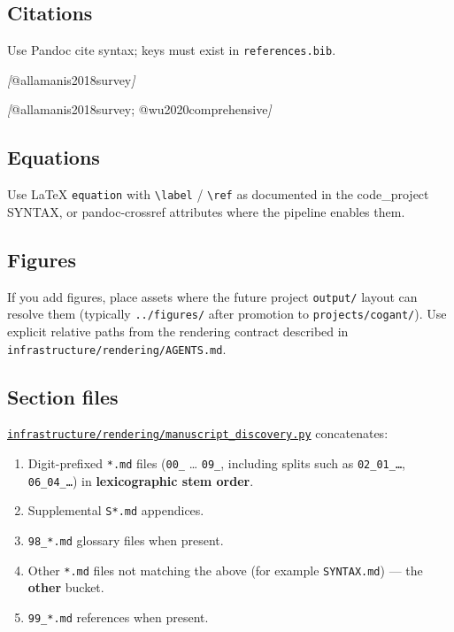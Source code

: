 \documentclass[
]{article}
\newenvironment{Shaded}{}{}
\newcommand{\CommentTok}[1]{\textcolor[rgb]{0.38,0.63,0.69}{\textit{#1}}}
\newcommand{\OtherTok}[1]{\textcolor[rgb]{0.00,0.44,0.13}{#1}}
\providecommand{\tightlist}{%
  \setlength{\itemsep}{0pt}\setlength{\parskip}{0pt}}
\begin{document}
\subsection{Citations}\label{citations}

Use Pandoc cite syntax; keys must exist in \texttt{references.bib}.

\begin{Shaded}
\begin{Highlighting}[]
\CommentTok{[}\OtherTok{@allamanis2018survey}\CommentTok{]}

\CommentTok{[}\OtherTok{@allamanis2018survey; @wu2020comprehensive}\CommentTok{]}
\end{Highlighting}
\end{Shaded}

\subsection{Equations}\label{equations}

Use LaTeX \texttt{equation} with \texttt{\textbackslash{}label} /
\texttt{\textbackslash{}ref} as documented in the code\_project SYNTAX,
or pandoc-crossref attributes where the pipeline enables them.

\subsection{Figures}\label{figures}

If you add figures, place assets where the future project
\texttt{output/} layout can resolve them (typically \texttt{../figures/}
after promotion to \texttt{projects/cogant/}). Use explicit relative
paths from the rendering contract described in
\texttt{infrastructure/rendering/AGENTS.md}.

\subsection{Section files}\label{section-files}

\href{../../../infrastructure/rendering/manuscript_discovery.py}{\texttt{infrastructure/rendering/manuscript\_discovery.py}}
concatenates:

\begin{enumerate}
\def\labelenumi{\arabic{enumi}.}
\tightlist
\item
  Digit-prefixed \texttt{*.md} files (\texttt{00\_} \ldots{}
  \texttt{09\_}, including splits such as \texttt{02\_01\_…},
  \texttt{06\_04\_…}) in \textbf{lexicographic stem order}.
\item
  Supplemental \texttt{S*.md} appendices.
\item
  \texttt{98\_*.md} glossary files when present.
\item
  Other \texttt{*.md} files not matching the above (for example
  \texttt{SYNTAX.md}) --- the \textbf{other} bucket.
\item
  \texttt{99\_*.md} references when present.
\end{enumerate}
\end{document}
